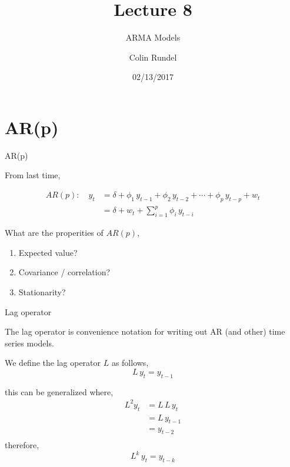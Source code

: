 \documentclass[11pt,ignorenonframetext,]{beamer}
\title{Lecture 8}
\subtitle{ARMA Models}
\author{Colin Rundel}
\date{02/13/2017}
\begin{document}
\frame{\titlepage}

\section{AR(p)}\label{arp}

\begin{frame}[t]{AR(p)}

From last time,

\[
\begin{aligned}
AR(p): \quad y_t 
  &= \delta + \phi_1 \, y_{t-1} + \phi_2 \, y_{t-2} + \cdots + \phi_p \, y_{t-p} + w_t  \\
  &= \delta + w_t + \sum_{i=1}^p \phi_i \, y_{t-i}
\end{aligned}
\]

What are the properities of \(AR(p)\),

\begin{enumerate}
\def\labelenumi{\arabic{enumi}.}
\item
  Expected value? \[~\]
\item
  Covariance / correlation? \[~\]
\item
  Stationarity? \[~\]
\end{enumerate}

\end{frame}

\begin{frame}{Lag operator}

The lag operator is convenience notation for writing out AR (and other)
time series models.

We define the lag operator \(L\) as follows, \[L \, y_t = y_{t-1}\]

\pause

this can be generalized where, \[
\begin{aligned}
L^2 y_t &= L\,L\, y_{t}\\
        &= L \, y_{t-1} \\
        &= y_{t-2} \\
\end{aligned}
\] therefore, \[L^k \, y_t = y_{t-k}\]

\end{frame}
\end{document}
